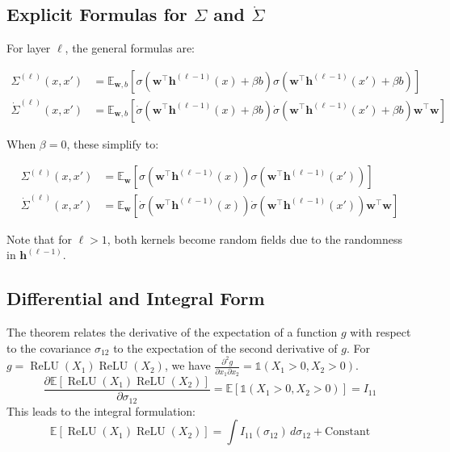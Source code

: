 \documentclass[11pt, a4paper]{article}
\newcommand{\E}{\mathbb{E}}
\newcommand{\dd}{\,d} %
\DeclareMathOperator{\ReLU}{ReLU}
\newcommand{\indic}{\mathbb{1}}
\begin{document}
\subsection{Explicit Formulas for $\Sigma$ and $\dot{\Sigma}$}

For layer $\ell$, the general formulas are:

\begin{align*}
\Sigma^{(\ell)}(x, x') &= \mathbb{E}_{\bm{w}, b} \left[ \sigma(\bm{w}^\top \bm{h}^{(\ell-1)}(x) + \beta b) \sigma(\bm{w}^\top \bm{h}^{(\ell-1)}(x') + \beta b) \right] \\
\dot{\Sigma}^{(\ell)}(x, x') &= \mathbb{E}_{\bm{w}, b} \left[ \dot{\sigma}(\bm{w}^\top \bm{h}^{(\ell-1)}(x) + \beta b) \dot{\sigma}(\bm{w}^\top \bm{h}^{(\ell-1)}(x') + \beta b) \bm{w}^\top\bm{w} \right]
\end{align*}

When $\beta = 0$, these simplify to:

\begin{align*}
\Sigma^{(\ell)}(x, x') &= \mathbb{E}_{\bm{w}} \left[ \sigma(\bm{w}^\top \bm{h}^{(\ell-1)}(x)) \sigma(\bm{w}^\top \bm{h}^{(\ell-1)}(x')) \right] \\
\dot{\Sigma}^{(\ell)}(x, x') &= \mathbb{E}_{\bm{w}} \left[ \dot{\sigma}(\bm{w}^\top \bm{h}^{(\ell-1)}(x)) \dot{\sigma}(\bm{w}^\top \bm{h}^{(\ell-1)}(x')) \bm{w}^\top\bm{w} \right]
\end{align*}

Note that for $\ell > 1$, both kernels become random fields due to the randomness in $\bm{h}^{(\ell-1)}$.




\subsection{Differential and Integral Form}
The theorem relates the derivative of the expectation of a function $g$ with respect to the covariance $\sigma_{12}$ to the expectation of the second derivative of $g$. For $g = \ReLU(X_1)\ReLU(X_2)$, we have $\frac{\partial^2 g}{\partial x_1 \partial x_2} = \indic(X_1>0, X_2>0)$.
\[
\frac{\partial \E[\ReLU(X_1)\ReLU(X_2)]}{\partial \sigma_{12}} = \E[\indic(X_1>0, X_2>0)] = I_{11}
\]
This leads to the integral formulation:
\[
\E[\ReLU(X_1)\ReLU(X_2)] = \int I_{11}(\sigma_{12}) \dd\sigma_{12} + \text{Constant}
\]
\end{document}
